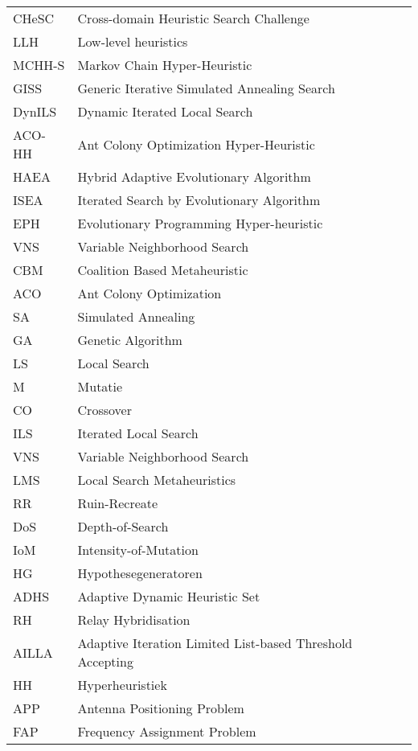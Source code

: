 \begin{flushleft}
  \renewcommand{\arraystretch}{1.1}
  \begin{tabularx}{\textwidth}{@{}p{18mm}X@{}}%
    CHeSC	& Cross-domain Heuristic Search Challenge \\
    LLH		&Low-level heuristics \\
    MCHH-S	&Markov Chain Hyper-Heuristic\\
    GISS	&Generic Iterative Simulated Annealing Search\\
    DynILS	&Dynamic Iterated Local Search\\
    ACO-HH	&Ant Colony Optimization Hyper-Heuristic\\
    HAEA	&Hybrid Adaptive Evolutionary Algorithm\\
    ISEA	&Iterated Search by Evolutionary Algorithm\\
    EPH		&Evolutionary Programming Hyper-heuristic\\
    VNS		&Variable Neighborhood Search\\
    CBM		&Coalition Based Metaheuristic\\
    ACO		&Ant Colony Optimization\\
    SA		&Simulated Annealing\\
    GA		&Genetic Algorithm\\
    LS		&Local Search\\
    M		&Mutatie\\
    CO		&Crossover\\
    ILS		&Iterated Local Search\\
    VNS		&Variable Neighborhood Search\\
    LMS		&Local Search Metaheuristics\\
    RR		&Ruin-Recreate\\
    DoS		&Depth-of-Search\\
    IoM		&Intensity-of-Mutation\\
    HG		&Hypothesegeneratoren\\
    ADHS	&Adaptive Dynamic Heuristic Set\\
    RH		&Relay Hybridisation\\
    AILLA	&Adaptive Iteration Limited List-based Threshold Accepting\\
    HH		&Hyperheuristiek\\
    APP		&Antenna Positioning Problem\\
    FAP		&Frequency Assignment Problem\\
    
  \end{tabularx}
\end{flushleft}